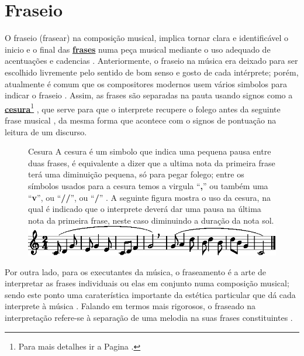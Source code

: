 \section{Fraseio}
\label{sec:fraseio}

O fraseio (frasear) na composição musical, implica  tornar clara e identificável 
o inicio e o final das \hyperref[sec:Frase]{\textbf{frases}} numa peça musical 
mediante o uso adequado de acentuações e cadencias
\cite[pp. 336]{medteoria} \cite[pp. 19]{holst1998abc}.
Anteriormente, 
o fraseio na música era deixado para ser escolhido livremente pelo sentido de bom senso e gosto de cada intérprete;
porém, atualmente é comum que os compositores modernos usem vários simbolos para indicar o fraseio \cite[pp. 348]{stainer2009dictionary}.
Assim, as frases são separadas na pauta usando signos como a \hyperref[fig:Cesura]{\textbf{cesura}}\footnote{Para
 mais detalhes ir a Pagina \pageref{fig:Cesura}.}  \cite[pp. 668]{apel1969harvard},
que serve para que o interprete recupere o folego 
antes da seguinte frase musical \cite[pp. 18]{holst1998abc} \cite[pp. 48]{howard1991aprendendo},
da mesma forma que acontece com o signos de pontuação na leitura de um discurso.




\begin{figure}[!h]
\begin{elaboracion}{Cesura}
A cesura é um simbolo que indica uma pequena pausa entre duas frases,
é equivalente a dizer que a ultima nota da primeira frase terá uma diminuição pequena, só para pegar folego;
entre os símbolos usados para a cesura temos a virgula ``\textbf{,}'' 
ou também uma ``\textbf{v}'', ou ``\textbf{//}'', ou ``\textbf{/}'' 
\cite[pp. 252]{medteoria} \cite[pp. 18]{holst1998abc}.
A seguinte figura mostra o uso da cesura, na qual é indicado que o interprete deverá 
dar uma pausa na última nota da primeira frase, neste caso diminuindo a duração da nota sol.\\
\includegraphics[width=\textwidth]{chapters/cap-musica-topicos/cesura1-1.eps}
\end{elaboracion}
\label{fig:Cesura}
\end{figure}
 
Por outra lado, para os executantes da música, 
o fraseamento é a arte de interpretar as frases individuais ou elas em conjunto numa composição musical;
sendo este ponto 
uma caraterística importante da estética particular que dá cada interprete à música 
\cite[pp. 257]{medteoria} \cite[pp. 624]{latham2008diccionario}.
Falando em termos mais rigorosos, 
o fraseado na interpretação refere-se à separação de uma melodia na suas frases constituintes 
\cite[pp. 668]{apel1969harvard}.


